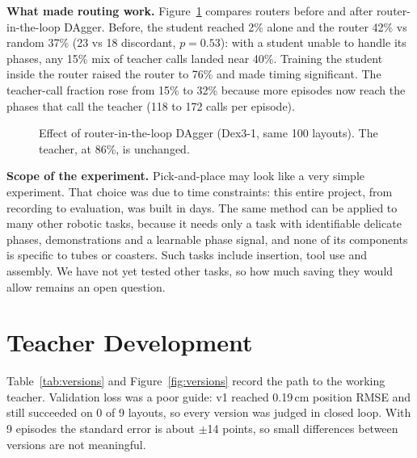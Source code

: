 \documentclass[10pt,twocolumn]{article}
\begin{document}
\textbf{What made routing work.} Figure~\ref{fig:dagger} compares routers before and after router-in-the-loop DAgger. Before, the
student reached 2\% alone and the router 42\% vs random 37\% (23 vs 18 discordant, $p = 0.53$): with a student unable to
handle its phases, any 15\% mix of teacher calls landed near 40\%. Training the student inside the router raised
the router to 76\% and made timing significant. The teacher-call fraction rose from 15\% to 32\% because more
episodes now reach the phases that call the teacher (118 to 172 calls per episode).

\begin{figure}[t]
\centering
{}
\caption{Effect of router-in-the-loop DAgger (Dex3-1, same 100 layouts). The teacher, at 86\%, is unchanged.}
\label{fig:dagger}
\end{figure}

\textbf{Scope of the experiment.} Pick-and-place may look like a very simple experiment. That choice was due to time
constraints: this entire project, from recording to evaluation, was built in days. The same method can be applied to
many other robotic tasks, because it needs only a task with identifiable delicate phases, demonstrations and a
learnable phase signal, and none of its components is specific to tubes or coasters. Such tasks include insertion,
tool use and assembly. We have not yet tested other tasks, so how much saving they would allow remains an open question.

\section{Teacher Development}
Table~\ref{tab:versions} and Figure~\ref{fig:versions} record the path to the working teacher. Validation loss was a
poor guide: v1 reached 0.19\,cm position RMSE and still succeeded on 0 of 9 layouts, so every version was judged in closed loop.
With 9 episodes the standard error is about $\pm$14 points, so small differences between versions are not meaningful.
\end{document}
